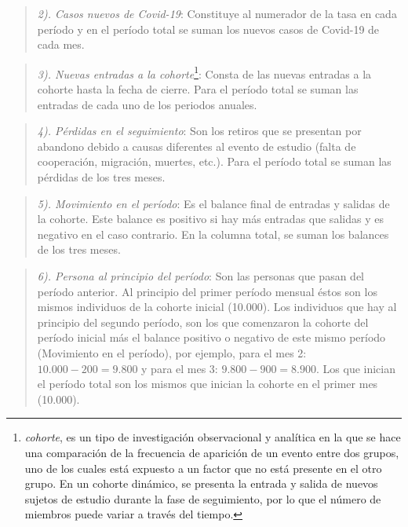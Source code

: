 \documentclass[
  11pt,
]{book}
\begin{document}
\begin{quote}
\emph{2). Casos nuevos de Covid-19}: Constituye al numerador de la tasa en cada período y en el período total se suman los nuevos casos de Covid-19 de cada mes.
\end{quote}

\begin{quote}
\emph{3). Nuevas entradas a la cohorte}\footnote{\emph{cohorte}, es un tipo de investigación observacional y analítica en la que se hace una comparación de la frecuencia de aparición de un evento entre dos grupos, uno de los cuales está expuesto a un factor que no está presente en el otro grupo. En un cohorte dinámico, se presenta la entrada y salida de nuevos sujetos de estudio durante la fase de seguimiento, por lo que el número de miembros puede variar a través del tiempo.}: Consta de las nuevas entradas a la
cohorte hasta la fecha de cierre. Para el período total se suman las entradas de cada uno de los periodos anuales.
\end{quote}

\begin{quote}
\emph{4). Pérdidas en el seguimiento}: Son los retiros que se presentan por abandono debido a causas diferentes al evento de estudio (falta de cooperación, migración, muertes, etc.). Para el período total se suman las pérdidas de los tres meses.
\end{quote}

\begin{quote}
\emph{5). Movimiento en el período}: Es el balance final de entradas y salidas de
la cohorte. Este balance es positivo si hay más entradas que salidas y es negativo en el caso contrario. En la columna total, se suman los balances de los tres meses.
\end{quote}

\begin{quote}
\emph{6). Persona al principio del período}: Son las personas que pasan del
período anterior. Al principio del primer período mensual éstos son los
mismos individuos de la cohorte inicial (10.000). Los individuos que hay al principio del segundo período, son los que comenzaron la cohorte del período inicial más el balance positivo o negativo de este mismo período (Movimiento en el período), por ejemplo, para el mes 2: \(10.000-200=9.800\) y para el mes 3: \(9.800-900=8.900\). Los que inician el período total son los mismos que inician la cohorte en el primer mes (10.000).
\end{quote}
\end{document}
